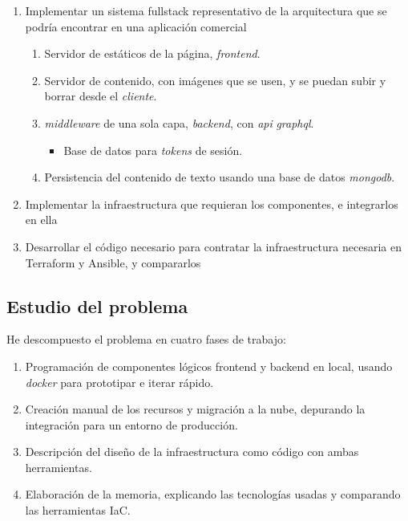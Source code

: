 \documentclass[11pt]{article}
\begin{document}
\begin{flushleft}
		\begin{enumerate}
			\itemsep0em 
			\item Implementar un sistema fullstack representativo de la arquitectura que se podría encontrar en una aplicación comercial
				\begin{enumerate}
					\itemsep0em 
					\item Servidor de estáticos de la página, \textit{\gls{frontend}}.
					\item Servidor de contenido, con imágenes que se usen, y se puedan subir y borrar desde el \textit{\gls{cliente}}.
					\item \textit{\gls{middleware}} de una sola capa, \textit{\gls{backend}}, con \textit{\acrshort{api}} \textit{\gls{graphql}}.
						\begin{itemize}
							\itemsep0em 
							\item Base de datos para \textit{\gls{token}s} de sesión.
						\end{itemize}
					\item Persistencia del contenido de texto usando una base de datos \textit{\gls{mongodb}}.
				\end{enumerate}
            \item Implementar la infraestructura que requieran los componentes, e integrarlos en ella
			\item Desarrollar el código necesario para contratar la infraestructura necesaria en Terraform y Ansible, y compararlos
		\end{enumerate}

    \bigskip
    \bigskip
    \subsection{Estudio del problema}
	He descompuesto el problema en cuatro fases de trabajo:
		\begin{enumerate}
			\itemsep0em 
			\item Programación de componentes lógicos frontend y backend en local, usando \textit{\gls{docker}} para prototipar e iterar rápido.
			\item Creación manual de los recursos y migración a la nube, depurando la integración para un entorno de producción.
			\item Descripción del diseño de la infraestructura como código con ambas herramientas.
            \item Elaboración de la memoria, explicando las tecnologías usadas y comparando las herramientas IaC.
		\end{enumerate}


\end{flushleft}
\end{document}
